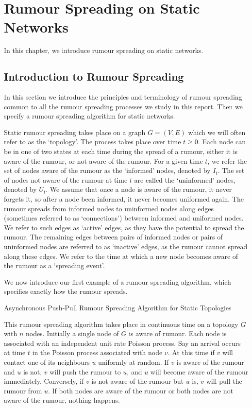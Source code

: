 \chapter{Rumour Spreading on Static Networks}\label{chapter:staticIntro}

In this chapter, we introduce rumour spreading on static networks.

\section{Introduction to Rumour Spreading}

In this section we introduce the principles and terminology of rumour spreading common to all the rumour spreading processes we study in this report. Then we specify a rumour spreading algorithm for static networks.

Static rumour spreading takes place on a graph $G=(V,E)$ which we will often refer to as the `topology'. The process takes place over time $t \geq 0$. Each node can be in one of two states at each time during the spread of a rumour, either it is aware of the rumour, or not aware of the rumour. For a given time $t$, we refer the set of nodes aware of the rumour as the `informed' nodes, denoted by $I_t$. The set of nodes not aware of the rumour at time $t$ are called the `uninformed' nodes, denoted by $U_t$. We assume that once a node is aware of the rumour, it never forgets it, so after a node been informed, it never becomes uniformed again. The rumour spreads from informed nodes to uninformed nodes along edges (sometimes referred to as `connections') between informed and uniformed nodes. We refer to such edges as `active' edges, as they have the potential to spread the rumour. The remaining edges between pairs of informed nodes or pairs of uninformed nodes are referred to as `inactive' edges, as the rumour cannot spread along these edges. We refer to the time at which a new node becomes aware of the rumour as a `spreading event'.

We now introduce our first example of a rumour spreading algorithm, which specifies exactly how the rumour spreads.  

\begin{definition}\label{algo:staticAsync}
	Asynchronous Push-Pull Rumour Spreading Algorithm for Static Topologies

	\noindent
	This rumour spreading algorithm takes place in continuous time on a topology $G$ with $n$ nodes.
	Initially a single node of $G$ is aware of rumour. Each node is associated with an independent unit rate Poisson process. Say an arrival occurs at time $t$ in the Poisson process associated with node $v$. At this time if $v$ will contact one of its neighbours $u$ uniformly at random. If $v$ is aware of the rumour and $u$ is not, $v$ will push the rumour to $u$, and $u$ will become aware of the rumour immediately. Conversely, if $v$ is not aware of the rumour but $u$ is, $v$ will pull the rumour from $u$. If both nodes are aware of the rumour or both nodes are not aware of the rumour, nothing happens.
\end{definition}

